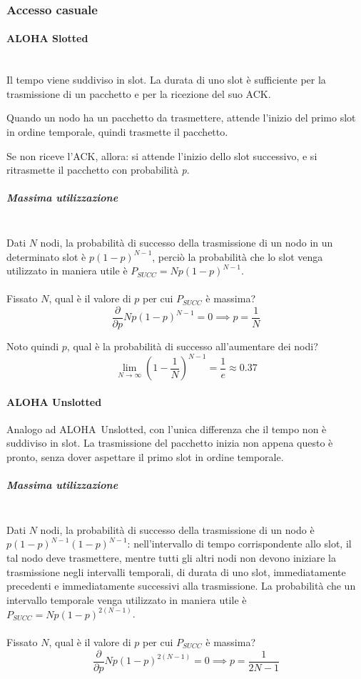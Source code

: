 \documentclass[12pt,a4paper]{article}
\begin{document}
\subsubsection{Accesso casuale}
\paragraph{ALOHA Slotted}\mbox{}\\
Il tempo viene suddiviso in slot.
La durata di uno slot è sufficiente per la trasmissione di un pacchetto
e per la ricezione del suo ACK.

Quando un nodo ha un pacchetto da trasmettere, attende l'inizio del
primo slot in ordine temporale, quindi trasmette il pacchetto.

Se non riceve l'ACK, allora: si attende l'inizio dello slot successivo,
e si ritrasmette il pacchetto con probabilità \emph{p}.

\subparagraph{Massima utilizzazione}\mbox{}\\
Dati $N$ nodi, la probabilità di successo della trasmissione di un nodo
in un determinato slot è $p(1-p)^{N-1}$, perciò la probabilità che lo
slot venga utilizzato in maniera utile è $P_{SUCC} = Np(1-p)^{N-1}$.
\\ \\
Fissato $N$, qual è il valore di $p$ per cui $P_{SUCC}$ è massima?
$$ \frac{\partial}{\partial p} Np(1-p)^{N-1} = 0 \implies p = \frac{1}{N} $$

Noto quindi $p$, qual è la probabilità di successo all'aumentare dei nodi?
$$ \lim_{N\to\infty} \left(1-\frac{1}{N}\right)^{N-1} = \frac{1}{e} \approx 0.37 $$

\paragraph{ALOHA Unslotted}
Analogo ad ALOHA~Unslotted, con l'unica differenza che il tempo non è
suddiviso in slot. La trasmissione del pacchetto inizia non appena
questo è pronto, senza dover aspettare il primo slot in ordine
temporale.

\subparagraph{Massima utilizzazione}\mbox{}\\
Dati $N$ nodi, la probabilità di successo della trasmissione di un nodo
è $p(1-p)^{N-1}(1-p)^{N-1}$: nell'intervallo di tempo corrispondente
allo slot, il tal nodo deve trasmettere, mentre tutti gli altri nodi
non devono iniziare la trasmissione negli intervalli temporali, di
durata di uno slot, immediatamente precedenti e immediatamente
successivi alla trasmissione. La probabilità che un intervallo temporale
venga utilizzato in maniera utile è
$P_{SUCC} = Np(1-p)^{2(N-1)} $.
\\ \\
Fissato $N$, qual è il valore di $p$ per cui $P_{SUCC}$ è massima?
$$ \frac{\partial}{\partial p} Np(1-p)^{2(N-1)} = 0 \implies p = \frac{1}{2N-1}$$
\end{document}
